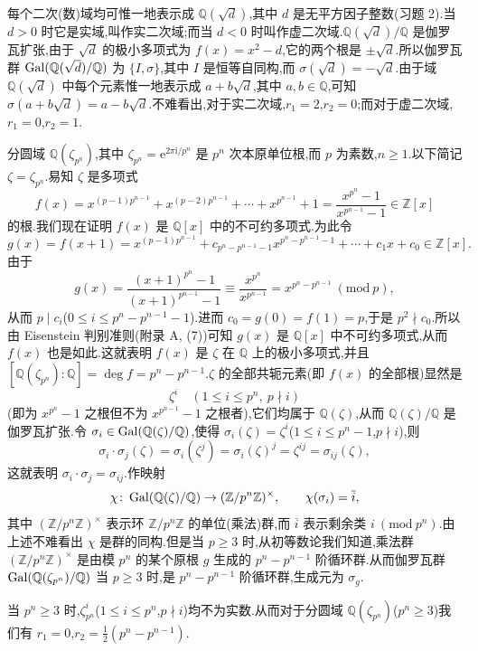 \begin{example}\label{ex:ch1-1-1}
每个二次(数)域均可惟一地表示成 $\mathbb{Q}(\sqrt{d})$,其中 $d$ 是无平方因子整数(习题 2).当 $d>0$ 时它是实域,叫作实二次域;而当 $d<0$ 时叫作虚二次域.$\mathbb{Q}(\sqrt{d})/\mathbb{Q}$ 是伽罗瓦扩张,由于 $\sqrt{d}$ 的极小多项式为 $f(x)=x^2-d$,它的两个根是 $\pm\sqrt{d}$.所以伽罗瓦群 $\operatorname{Gal}(\mathbb{Q}(\sqrt{d})/\mathbb{Q})$ 为 $\{I,\sigma\}$,其中 $I$ 是恒等自同构,而 $\sigma(\sqrt{d})=-\sqrt{d}$.由于域 $\mathbb{Q}(\sqrt{d})$ 中每个元素惟一地表示成 $a+b\sqrt{d}$,其中 $a,b\in\mathbb{Q}$,可知 $\sigma(a+b\sqrt{d})=a-b\sqrt{d}$.不难看出,对于实二次域,$r_1=2$,$r_2=0$;而对于虚二次域,$r_1=0$,$r_2=1$.
\end{example}

\begin{example}\label{ex:ch1-1-2}
分圆域 $\mathbb{Q}(\zeta_{p^n})$,其中 $\zeta_{p^n}=\mathrm{e}^{2\pi\mathrm{i}/p^n}$ 是 $p^n$ 次本原单位根,而 $p$ 为素数,$n\geqslant 1$.以下简记 $\zeta=\zeta_{p^n}$.易知 $\zeta$ 是多项式
\[
  f(x)=x^{(p-1)p^{n-1}}+x^{(p-2)p^{n-1}}+\cdots+x^{p^{n-1}}+1
  =\frac{x^{p^n}-1}{x^{p^{n-1}}-1}\in\mathbb{Z}[x]
\]
的根.我们现在证明 $f(x)$ 是 $\mathbb{Q}[x]$ 中的不可约多项式.为此令
\[
  g(x)=f(x+1)=x^{(p-1)p^{n-1}}+c_{p^n-p^{n-1}-1}x^{p^n-p^{n-1}-1}+\cdots+c_1x+c_0\in\mathbb{Z}[x].
\]
由于
\[
  g(x)=\frac{(x+1)^{p^n}-1}{(x+1)^{p^{n-1}}-1}\equiv\frac{x^{p^n}}{x^{p^{n-1}}}=x^{p^n-p^{n-1}}\ (\mathrm{mod}\ p),
\]
从而 $p\mid c_i$($0\leqslant i\leqslant p^n-p^{n-1}-1$).进而 $c_0=g(0)=f(1)=p$,于是 $p^2\nmid c_0$.所以由 Eisenstein 判别准则(附录 A, (7))可知 $g(x)$ 是 $\mathbb{Q}[x]$ 中不可约多项式,从而 $f(x)$ 也是如此.这就表明 $f(x)$ 是 $\zeta$ 在 $\mathbb{Q}$ 上的极小多项式,并且 $[\mathbb{Q}(\zeta_{p^n}):\mathbb{Q}]=\deg f=p^n-p^{n-1}$.$\zeta$ 的全部共轭元素(即 $f(x)$ 的全部根)显然是
\[
  \zeta^i\quad (1\leqslant i\leqslant p^n,\ p\nmid i)
\]
(即为 $x^{p^n}-1$ 之根但不为 $x^{p^{n-1}}-1$ 之根者),它们均属于 $\mathbb{Q}(\zeta)$,从而 $\mathbb{Q}(\zeta)/\mathbb{Q}$ 是伽罗瓦扩张.令 $\sigma_i\in\operatorname{Gal}(\mathbb{Q}(\zeta)/\mathbb{Q})$,使得 $\sigma_i(\zeta)=\zeta^i$($1\leqslant i\leqslant p^n-1$,$p\nmid i$),则
\[
  \sigma_i\cdot\sigma_j(\zeta)=\sigma_i(\zeta^j)=\sigma_i(\zeta)^j=\zeta^{ij}=\sigma_{ij}(\zeta),
\]
这就表明 $\sigma_i\cdot\sigma_j=\sigma_{ij}$.作映射
\[
  \chi\colon\operatorname{Gal}(\mathbb{Q}(\zeta)/\mathbb{Q})\to(\mathbb{Z}/p^n\mathbb{Z})^\times,\qquad
  \chi(\sigma_i)=\overline{i},
\]
其中 $(\mathbb{Z}/p^n\mathbb{Z})^\times$ 表示环 $\mathbb{Z}/p^n\mathbb{Z}$ 的单位(乘法)群,而 $\overline{i}$ 表示剩余类 $i\ (\mathrm{mod}\ p^n)$.由上述不难看出 $\chi$ 是群的同构.但是当 $p\geqslant 3$ 时,从初等数论我们知道,乘法群 $(\mathbb{Z}/p^n\mathbb{Z})^\times$ 是由模 $p^n$ 的某个原根 $g$ 生成的 $p^n-p^{n-1}$ 阶循环群.从而伽罗瓦群 $\operatorname{Gal}(\mathbb{Q}(\zeta_{p^n})/\mathbb{Q})$ 当 $p\geqslant 3$ 时,是 $p^n-p^{n-1}$ 阶循环群,生成元为 $\sigma_g$.

当 $p^n\geqslant 3$ 时,$\zeta_{p^n}^i$($1\leqslant i\leqslant p^n$,$p\nmid i$)均不为实数.从而对于分圆域 $\mathbb{Q}(\zeta_{p^n})$($p^n\geqslant 3$)我们有 $r_1=0$,$r_2=\frac{1}{2}(p^n-p^{n-1})$.
\end{example}

